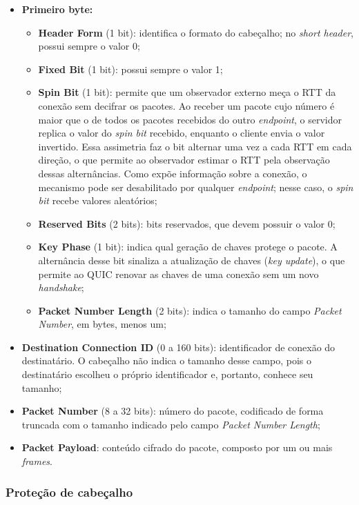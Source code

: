 \begin{itemize}
    \item \textbf{Primeiro byte:}
    \begin{itemize}
        \item \textbf{Header Form} (1 bit): identifica o formato do cabeçalho; no \textit{short header}, possui sempre o valor 0;
        \item \textbf{Fixed Bit} (1 bit): possui sempre o valor 1;
        \item \textbf{Spin Bit} (1 bit): permite que um observador externo meça o RTT da conexão sem decifrar os pacotes. Ao receber um pacote cujo número é maior que o de todos os pacotes recebidos do outro \textit{endpoint}, o servidor replica o valor do \textit{spin bit} recebido, enquanto o cliente envia o valor invertido. Essa assimetria faz o bit alternar uma vez a cada RTT em cada direção, o que permite ao observador estimar o RTT pela observação dessas alternâncias. Como expõe informação sobre a conexão, o mecanismo pode ser desabilitado por qualquer \textit{endpoint}; nesse caso, o \textit{spin bit} recebe valores aleatórios;
        \item \textbf{Reserved Bits} (2 bits): bits reservados, que devem possuir o valor 0;
        \item \textbf{Key Phase} (1 bit): indica qual geração de chaves protege o pacote. A alternância desse bit sinaliza a atualização de chaves (\textit{key update}), o que permite ao QUIC renovar as chaves de uma conexão sem um novo \textit{handshake};
        \item \textbf{Packet Number Length} (2 bits): indica o tamanho do campo \textit{Packet Number}, em bytes, menos um;
    \end{itemize}
    \item \textbf{Destination Connection ID} (0 a 160 bits): identificador de conexão do destinatário. O cabeçalho não indica o tamanho desse campo, pois o destinatário escolheu o próprio identificador e, portanto, conhece seu tamanho;
    \item \textbf{Packet Number} (8 a 32 bits): número do pacote, codificado de forma truncada com o tamanho indicado pelo campo \textit{Packet Number Length};
    \item \textbf{Packet Payload}: conteúdo cifrado do pacote, composto por um ou mais \textit{frames}.
\end{itemize}

\subsubsection{Proteção de cabeçalho}
\label{sec:quic_header_protection}

